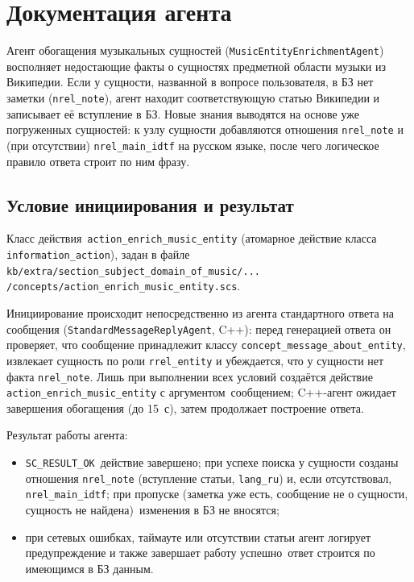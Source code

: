 \section{Документация агента}
\label{sec:agent}

Агент обогащения музыкальных сущностей (\texttt{MusicEntityEnrichmentAgent}) восполняет недостающие факты о сущностях предметной области музыки из Википедии. Если у сущности, названной в вопросе пользователя, в БЗ нет заметки (\texttt{nrel\_note}), агент находит соответствующую статью Википедии и записывает её вступление в БЗ. Новые знания выводятся на основе уже погруженных сущностей: к узлу сущности добавляются отношения \texttt{nrel\_note} и (при отсутствии) \texttt{nrel\_main\_idtf} на русском языке, после чего логическое правило ответа строит по ним фразу.

\subsection{Условие инициирования и результат}

Класс действия~\mdash  \texttt{action\_enrich\_music\_entity} (атомарное действие класса \texttt{information\_action}), задан в файле \texttt{kb/extra/section\_subject\_domain\_of\_music/... \newline /concepts/action\_enrich\_music\_entity.scs}.

Инициирование происходит непосредственно из агента стандартного ответа на сообщения (\texttt{StandardMessageReplyAgent}, C++): перед генерацией ответа он проверяет, что сообщение принадлежит классу \texttt{concept\_message\_about\_entity}, извлекает сущность по роли \texttt{rrel\_entity} и убеждается, что у сущности нет факта \texttt{nrel\_note}. Лишь при выполнении всех условий создаётся действие \texttt{action\_enrich\_music\_entity} с аргументом~\mdash  сообщением; C++-агент ожидает завершения обогащения (до 15~с), затем продолжает построение ответа.

Результат работы агента:
\begin{itemize}
	\item \texttt{SC\_RESULT\_OK}~\mdash  действие завершено; при успехе поиска у сущности созданы отношения \texttt{nrel\_note} (вступление статьи, \texttt{lang\_ru}) и, если отсутствовал, \texttt{nrel\_main\_idtf}; при пропуске (заметка уже есть, сообщение не о сущности, сущность не найдена)~\mdash  изменения в БЗ не вносятся;
	\item при сетевых ошибках, таймауте или отсутствии статьи агент логирует предупреждение и также завершает работу успешно~\mdash  ответ строится по имеющимся в БЗ данным.
\end{itemize}

